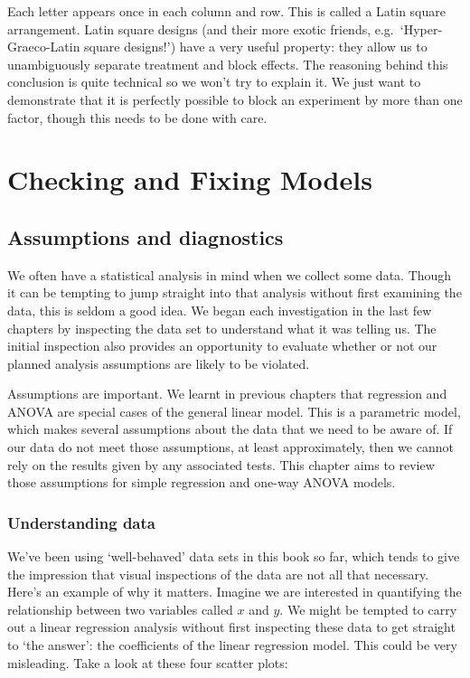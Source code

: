 \documentclass[
]{book}
\begin{document}
Each letter appears once in each column and row. This is called a Latin square arrangement. Latin square designs (and their more exotic friends, e.g.~`Hyper-Graeco-Latin square designs!') have a very useful property: they allow us to unambiguously separate treatment and block effects. The reasoning behind this conclusion is quite technical so we won't try to explain it. We just want to demonstrate that it is perfectly possible to block an experiment by more than one factor, though this needs to be done with care.

\hypertarget{part-checking-and-fixing-models}{%
\part{Checking and Fixing Models}\label{part-checking-and-fixing-models}}

\hypertarget{assumptions-and-diagnostics}{%
\chapter{Assumptions and diagnostics}\label{assumptions-and-diagnostics}}

We often have a statistical analysis in mind when we collect some data. Though it can be tempting to jump straight into that analysis without first examining the data, this is seldom a good idea. We began each investigation in the last few chapters by inspecting the data set to understand what it was telling us. The initial inspection also provides an opportunity to evaluate whether or not our planned analysis assumptions are likely to be violated.

Assumptions are important. We learnt in previous chapters that regression and ANOVA are special cases of the general linear model. This is a parametric model, which makes several assumptions about the data that we need to be aware of. If our data do not meet those assumptions, at least approximately, then we cannot rely on the results given by any associated tests. This chapter aims to review those assumptions for simple regression and one-way ANOVA models.

\hypertarget{understanding-data}{%
\section{Understanding data}\label{understanding-data}}

We've been using `well-behaved' data sets in this book so far, which tends to give the impression that visual inspections of the data are not all that necessary. Here's an example of why it matters. Imagine we are interested in quantifying the relationship between two variables called \(x\) and \(y\). We might be tempted to carry out a linear regression analysis without first inspecting these data to get straight to `the answer': the coefficients of the linear regression model. This could be very misleading. Take a look at these four scatter plots:
\end{document}

